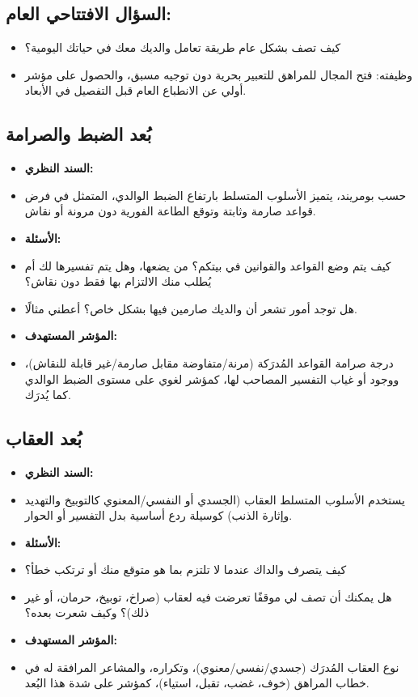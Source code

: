 \documentclass[12pt,oneside]{report}
\begin{document}
\subsection*{السؤال الافتتاحي العام:}
\begin{itemize}[leftmargin=1.6em,itemsep=1pt]
\item كيف تصف بشكل عام طريقة تعامل والديك معك في حياتك اليومية؟
\item وظيفته: فتح المجال للمراهق للتعبير بحرية دون توجيه مسبق، والحصول على مؤشر أولي عن الانطباع العام قبل التفصيل في الأبعاد.
\end{itemize}
\subsection*{بُعد الضبط والصرامة}
\begin{itemize}[leftmargin=1.6em,itemsep=1pt]
\item \textbf{السند النظري:}
\item حسب بومريند، يتميز الأسلوب المتسلط بارتفاع الضبط الوالدي، المتمثل في فرض   قواعد صارمة وثابتة وتوقع الطاعة الفورية دون مرونة أو نقاش.
\item \textbf{الأسئلة:}
\item كيف يتم وضع القواعد والقوانين في بيتكم؟ من يضعها، وهل يتم تفسيرها لك أم يُطلب منك الالتزام بها فقط دون نقاش؟
\item هل توجد أمور تشعر أن والديك صارمين فيها بشكل خاص؟ أعطني مثالًا.
\item \textbf{المؤشر المستهدف:}
\item درجة صرامة القواعد المُدرَكة (مرنة/متفاوضة مقابل صارمة/غير قابلة للنقاش)، ووجود أو غياب التفسير المصاحب لها، كمؤشر لغوي على مستوى الضبط الوالدي كما يُدرَك.
\end{itemize}
\subsection*{بُعد العقاب}
\begin{itemize}[leftmargin=1.6em,itemsep=1pt]
\item \textbf{السند النظري:}
\item يستخدم الأسلوب المتسلط العقاب (الجسدي أو النفسي/المعنوي كالتوبيخ والتهديد وإثارة الذنب) كوسيلة ردع أساسية بدل التفسير أو الحوار.
\item \textbf{الأسئلة:}
\item كيف يتصرف والداك عندما لا تلتزم بما هو متوقع منك أو ترتكب خطأ؟
\item هل يمكنك أن تصف لي موقفًا تعرضت فيه لعقاب (صراخ، توبيخ، حرمان، أو غير ذلك)؟ وكيف شعرت بعده؟
\item \textbf{المؤشر المستهدف:}
\item نوع العقاب المُدرَك (جسدي/نفسي/معنوي)، وتكراره، والمشاعر المرافقة له في خطاب المراهق (خوف، غضب، تقبل، استياء)، كمؤشر على شدة هذا البُعد.
\end{itemize}
\end{document}

